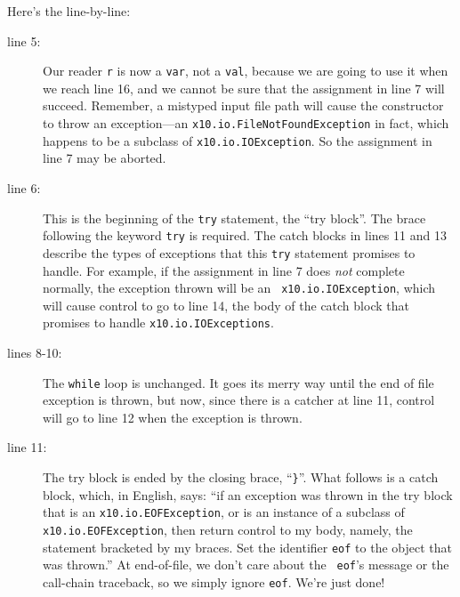 Here's the line-by-line:
\begin{description}
\item[line 5:]  Our reader {\tt r} is now a {\tt var}, not a {\tt val}, because
we are going to use it when we reach line 16, and we cannot be sure that the
assignment in line 7 will succeed.  Remember, a mistyped input file path will
cause the constructor to throw an exception---an
{\tt x10.io.File\-Not\-Found\-Excep\-tion} in fact, which happens to be a
subclass of {\tt x10.io.IO\-Excep\-tion}.  So the assignment in line 7 may be
aborted.
\item[line 6:] This is the beginning of the {\tt try} statement, the ``try block''.
The brace following the keyword {\tt try} is required.  The catch blocks in
lines 11 and 13 describe the types of exceptions that this {\tt try} statement
promises to handle.  For example, if the assignment in line 7 does {\em not}
complete normally, the exception thrown will be an {\tt
x10.io.IO\-Excep\-tion}, which will cause control to go to line 14, the body of
the catch block that promises to handle {\tt x10.io.IO\-Excep\-tions}.
\item[lines 8-10:] The {\tt while} loop is unchanged.  It goes its merry way
until the end of file exception is thrown, but now, since there is a catcher at
line 11, control will go to line 12 when the exception is thrown.
\item[line 11:] The try block is ended by the closing brace, ``{\tt \}}''. 
What follows is a catch block, which, in English, says: ``if an exception
was thrown in the try block that is an {\tt x10.io.EOFException}, or is an
instance of a subclass of {\tt x10.io.EOFException}, then return control to my
body, namely, the statement bracketed by my braces.  Set the identifier {\tt eof} 
to the object that was thrown.''  At end-of-file, we don't care about the {\tt
eof}'s message or the call-chain traceback, so we simply ignore {\tt eof}. 
We're just done!


\end{description}
